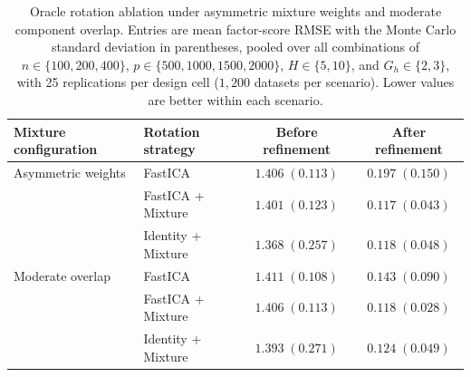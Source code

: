 \begin{table}[t]
\centering
\caption{Oracle rotation ablation under asymmetric mixture weights and moderate component overlap. Entries are mean factor-score RMSE with the Monte Carlo standard deviation in parentheses, pooled over all combinations of $n\in\{100,200,400\}$, $p\in\{500,1000,1500,2000\}$, $H\in\{5,10\}$, and $G_h\in\{2,3\}$, with 25 replications per design cell ($1{,}200$ datasets per scenario). Lower values are better within each scenario.}
\label{tab:rotation_ablation_supplement}
\begin{tabular}{llcc}
\toprule
Mixture configuration & Rotation strategy & Before refinement & After refinement \\
\midrule
Asymmetric weights
  & FastICA            & $1.406\;(0.113)$ & $0.197\;(0.150)$ \\
  & FastICA + Mixture  & $1.401\;(0.123)$ & $\mathbf{0.117}\;(\mathbf{0.043})$ \\
  & Identity + Mixture & $1.368\;(0.257)$ & $0.118\;(0.048)$ \\
\addlinespace
Moderate overlap
  & FastICA            & $1.411\;(0.108)$ & $0.143\;(0.090)$ \\
  & FastICA + Mixture  & $1.406\;(0.113)$ & $\mathbf{0.118}\;(\mathbf{0.028})$ \\
  & Identity + Mixture & $1.393\;(0.271)$ & $0.124\;(0.049)$ \\
\bottomrule
\end{tabular}
\end{table}

